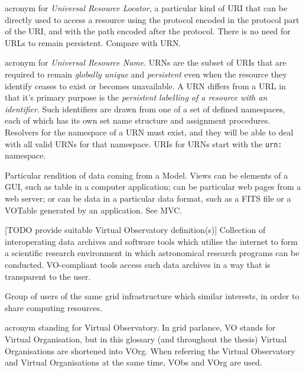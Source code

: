 {
    	acronym for \emph{Universal Resource Locator}, a particular
        kind of \gls{URI} that can be directly used to access a
        resource using the protocol encoded in the protocol part of the
        URI, and with the path encoded after the protocol. There is no
        need for URLs to remain persistent. Compare with \gls{URN}.
}

{
    	acronym for \emph{Universal Resource Name}. URNs are the subset
        of \gls{URI}s that are required to remain \emph{globally
        unique} and \emph{persistent} even when the resource they
        identify ceases to exist or becomes unavailable. A URN differs
        from a \gls{URL} in that it's primary purpose is the
        \emph{persistent labelling of a resource with an identifier}.
        Such identifiers are drawn from one of a set of defined
        namespaces, each of which has its own set name structure and
        assignment procedures. Resolvers for the namespace of a URN
        must exist, and they will be able to deal with all valid URNs
        for that namespace. URIs for URNs start with the \texttt{urn:}
        namespace.
}


{
    	Particular rendition of data coming from a \gls{Model}. Views
        can be elements of a \gls{GUI}, such as table in a computer
        application; can be particular web pages from a web server; or
        can be data in a particular data format, such as a \gls{FITS}
        file or a VOTable generated by an application. See \gls{MVC}.
}

{    	[TODO provide suitable Virtual Observatory definition(s)]
        Collection of interoperating data archives and software tools
        which utilise the internet to form a scientific research
        environment in which astronomical research programs can be
        conducted. VO-compliant tools access such data archives in a
        way that is transparent to the user.
}

{
    	Group of users of the same \gls{grid} infrastructure which
        similar interests, in order to share computing resources.
}

{
    	acronym standing for \gls{Virtual Observatory}. In \gls{grid}
        parlance, VO stands for \gls{Virtual Organisation}, but in this
        glossary (and throughout the thesis) Virtual Organisations are
        shortened into \gls{VOrg}. When referring the Virtual
        Observatory and Virtual Organisations at the same time,
        \gls{VObs} and \gls{VOrg} are used.
}

